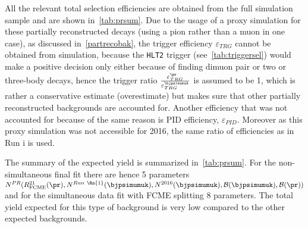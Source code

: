 All the relevant total selection efficiencies are obtained from the full simulation sample and are shown in~\autoref{tab:prsum}. Due to the usage of a proxy simulation for these partially reconstructed decays (using a pion rather than a muon in one case), as discussed in~\autoref{partrecobak}, the trigger efficiency $\varepsilon_{TRG}$ cannot be obtained from simulation, because the \texttt{HLT2} trigger (see~\autoref{tab:triggersel}) would make a positive decision only either because of finding dimuon pair or two or three-body decays, hence the trigger ratio $\frac{\varepsilon^{\pr}_{TRG}}{\varepsilon^{\bjpsimumuk}_{TRG}}$ 
is assumed to be 1, which is rather a conservative estimate (overestimate) but makes sure that other partially reconstructed backgrounds are accounted for. Another efficiency that was not accounted for because of the same reason is PID efficiency, $\varepsilon_{PID}$.
Moreover as this proxy simulation was not accessible for 2016, the same ratio of efficiencies as in Run \Rn{1} is used.


The summary of the expected yield is summarized in~\autoref{tab:prsum}. For the non-simultaneous final fit there are hence 5 parameters $N^{PR}(R^{21}_{\mathrm{FCME}}(\pr),N^{Run\ \Rn{1}}(\bjpsimumuk),N^{2016}(\bjpsimumuk), \mathcal{B}(\bjpsimumuk),\mathcal{B}(\pr))$ and for the simultaneous data fit with FCME splitting 8 parameters. The total yield expected for this type of background is very low compared to the other expected backgrounds.






